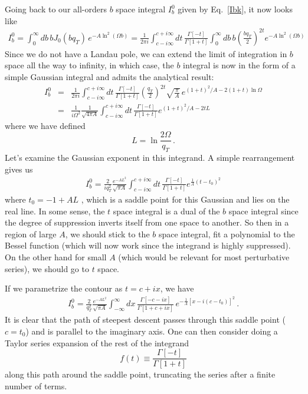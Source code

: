 \documentclass[a4,letterpaper,11pt]{article}
\newcommand{\nn}{\nonumber}
\newcommand{\be}{\begin{equation}}
\newcommand{\ee}{\end{equation}}
\newcommand{\bea}{\begin{eqnarray}}
\newcommand{\eea}{\end{eqnarray}}
\newcommand{\eq}[1]{Eq.~\eqref{#1}}
\begin{document}
Going back to our all-orders $b$ space integral $I_b^0$ given by \eq{Ibk}, it now looks like 
\bea \label{Ib}
I_b^0= \int_0^\infty db\, b J_0(b q_T)\, e^{-A\ln^2(\Omega b)}
= \frac{1}{2 \pi i}  \int_{c-i \infty}^{c+i \infty} dt \, \frac{\Gamma[-t]}{\Gamma[1+t]} 
 \int_0^\infty db\, b \left(\frac{b q_T}{2} \right)^{2t} e^{ -A \ln^2( \Omega b)}
\eea
Since we do not have a Landau pole,  we can extend the limit of integration in $b$ space all the way to infinity, in which case, the $b$ integral is now in the form of a simple Gaussian integral and admits the analytical result:
\bea
I_b^0 &=&  \frac{1}{2\pi i}  \int_{c -i \infty}^{c+i \infty} dt\, \frac{\Gamma[-t]}{\Gamma[1+t]} \left(\frac{q_T}{2}\right)^{2t}\sqrt{\frac{\pi}{A}} \,e^{ (1+t)^2/A- 2(1+t) \ln\Omega}
\nn\\
&=& \frac{1}{i \Omega^2} \frac{1}{\sqrt{4 \pi A}} \int_{c-i \infty}^{c+i \infty} dt\, \frac{\Gamma[-t]}{\Gamma[1+t]}e^{ (1+t)^2/A- 2t L}
\label{Ib-L}\eea
where we have defined 
\be\label{L}
L= \ln \frac{2 \Omega}{q_T}\,.
\ee
Let's examine the Gaussian exponent in this integrand. A simple rearrangement gives us 
\bea\label{Ib-t}
I_b^0 = \frac{ 2 }{i q_T^2} \frac{e^{-AL^2 }}{\sqrt{\pi A}} \int_{c-i \infty}^{c+i \infty} dt\, \frac{\Gamma[-t]}{\Gamma[1+t]}e^{ \frac{1}{A}(t-t_0)^2 }\nn
\eea
where $t_0 = -1+ A L$ , which is a saddle point for this Gaussian and lies on the real line.
In some sense, the $t$ space integral is a dual of the $b$ space integral since the degree of suppression inverts itself from one space to another. So then in a region of large $A$, we should stick to the $b$ space integral, fit a polynomial to the Bessel function (which will now work since the integrand is highly suppressed). On the other hand for small $A$ (which would be relevant for most perturbative series), we should go to $t$ space.

If we parametrize the contour as $t= c+ix$, we have 
\bea
 I_b^0 = \frac{ 2 }{q_T^2} \frac{e^{-AL^2 }}{\sqrt{\pi A}} \int_{-\infty}^{\infty} dx \, \frac{\Gamma[-c-ix]}{\Gamma[1+c+ix]}
 \,e^{ -\frac{1}{A}[x-i(c-t_0)]^2}
\,.\label{saddle}
\eea
It is clear that the path of steepest descent passes through this saddle point ($c=t_0$) and is parallel to the imaginary axis. 
One can then consider doing a Taylor series expansion of the rest of the integrand 
\be\label{ft}
f(t)\equiv \frac{\Gamma[-t]}{\Gamma[1+t]}
\ee
 along this path around the saddle point, truncating the series after a finite number of terms. 
\end{document}
